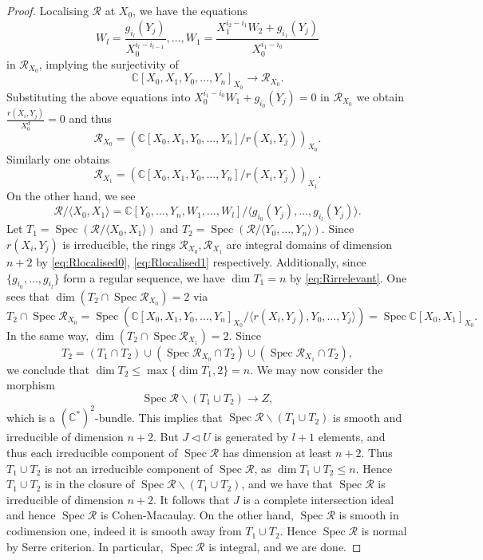 \documentclass[a4paper,11pt]{amsart}
\theoremstyle{plain}
\theoremstyle{definition}
\newcommand{\C}{\mathbb{C}}
\newcommand{\R}{\mathcal{R}}
\DeclareMathOperator{\Spec}{Spec}
\newcommand{\balazs}[1]{{\color{blue} [#1]}}
\begin{document}
\begin{proof}
Localising $\R$ at $X_0$, we have the equations
\[
W_l = \frac{g_{i_l}(Y_j)}{X_0^{i_l - i_{l-1}}}, \dots, W_1 = \frac{X_1^{i_2 -i_1}W_2 + g_{i_1}(Y_j)}{X_0^{i_1 - i_0}}
\]
in $\R_{X_0}$, implying the surjectivity of 
\[
\C[X_0,X_1,Y_0,\dots,Y_n]_{X_0} \rightarrow \R_{X_0}.
\]
Substituting the above equations into $X_0^{i_1 - i_0} W_1 + g_{i_0}(Y_j) = 0$ in $\R_{X_0}$ we obtain $\frac{r(X_i,Y_j)}{X_0^d} = 0$ and thus
\begin{equation}\label{eq:Rlocalised0}
    \R_{X_0} = \left(\C[X_0,X_1,Y_0,\dots,Y_n]/r(X_i,Y_j)  \right)_{X_0}.
\end{equation}
Similarly one obtains
\begin{equation}\label{eq:Rlocalised1}
    \R_{X_1} = \left(\C[X_0,X_1,Y_0,\dots,Y_n]/r(X_i,Y_j)  \right)_{X_1}.
\end{equation}
On the other hand, we see
\begin{equation}\label{eq:Rirrelevant}
    \R / \langle X_0,X_1 \rangle = \C[Y_0,\dots,Y_n,W_1,\dots,W_l]/\langle g_{i_0}(Y_j), \dots, g_{i_l}(Y_j)\rangle.
\end{equation}
Let $T_1 = \Spec (\R / \langle X_0, X_1 \rangle)$ and $T_2 = \Spec (\R / \langle Y_0, \dots,Y_n \rangle)$. Since $r(X_i,Y_j)$ is irreducible, the rings $\R_{X_0}, \R_{X_1}$ are integral domains of dimension $n+2$ by \eqref{eq:Rlocalised0}, \eqref{eq:Rlocalised1} respectively. Additionally, since $\{g_{i_0},\dots,g_{i_l}\}$ form a regular sequence, we have $\dim T_1 = n$ by \eqref{eq:Rirrelevant}. One sees that $\dim (T_2 \cap \Spec \R_{X_0}) = 2$ via
\[
T_2 \cap \Spec \R_{X_0} = \Spec( \C[X_0,X_1,Y_0,\dots,Y_n]_{X_0}/\langle r(X_i,Y_j),Y_0,\dots,Y_j\rangle ) = \Spec \C[X_0,X_1]_{X_0}.
\]
In the same way, $\dim (T_2 \cap \Spec \R_{X_1}) = 2$. Since
\[
T_2 = (T_1 \cap T_2) \cup (\Spec \R_{X_0} \cap T_2) \cup (\Spec \R_{X_1} \cap T_2),
\]
we conclude that $\dim T_2 \leq \max \{\dim T_1,2 \} = n$. We may now consider the morphism
\[
\Spec \R \backslash (T_1 \cup T_2) \rightarrow Z,
\]
which is a $(\C^*)^2$-bundle. This implies that $\Spec \R \backslash (T_1 \cup T_2)$ is smooth and irreducible of dimension $n+2$. But $J \lhd U$ is generated by $l+1$ elements, and thus each irreducible component of $\Spec \R$ has dimension at least $n+2$. 
Thus $T_1 \cup T_2$ is not an irreducible component of $\Spec \R$, as $\dim T_1 \cup T_2 \leq n$.
Hence $T_1 \cup T_2$ is in the closure of $\Spec \R \backslash (T_1 \cup T_2)$, and 
we have that $\Spec \R$ is irreducible of dimension $n+2$. 
It follows that $J$ is a complete intersection ideal and hence $\Spec \R$ is Cohen-Macaulay.
On the other hand, $\Spec \R$ is smooth in codimension one, indeed it is smooth away from $T_1 \cup T_2$.
Hence $\Spec \R$ is normal by Serre criterion.
In particular, $\Spec \R$ is integral, and we are done.
\end{proof}
\end{document}
